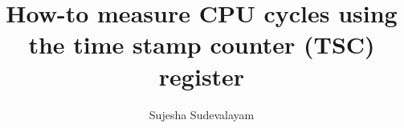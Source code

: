 \documentclass[11pt]{article}
\begin{document}
\title{How-to measure CPU cycles using the time stamp counter (TSC) register}
\author{Sujesha Sudevalayam}
\maketitle

\begin{abstract}

\end{abstract}













%
%
\end{document}

